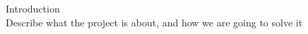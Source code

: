 \documentclass[report]{subfiles}
\begin{document}
Introduction\\
Describe what the project is about, and how we are going to solve it
\end{document}
